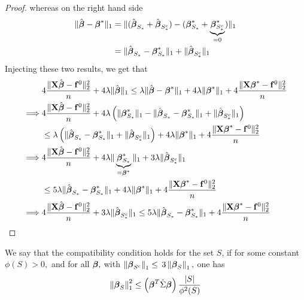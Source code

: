 \begin{proof}
    whereas on the right hand side
    \begin{align*}
        \|\hat{\boldsymbol{\beta}}-\boldsymbol{\beta}^{*} \|_{1}
         & =  \| (\hat{\boldsymbol{\beta}}_{S_{*}} + \hat{\boldsymbol{\beta}}_{S_{*}^{c}}) - (\boldsymbol{\beta}_{S_{*}}^{*} + \underbrace{\boldsymbol{\beta}_{S_{*}^{c}}^*}_{=0}) \|_{1} \\
         & =  \| \hat{\boldsymbol{\beta}}_{S_{*}}-\boldsymbol{\beta}_{S_{*}}^{*} \|_{1} + \|\hat{\boldsymbol{\beta}}_{S_{*}^{c}} \|_{1}
    \end{align*}
    Injecting these two results, we get that
    \begin{align*}
                 & 4 \frac{\| \mathbf{X} \hat {\boldsymbol{\beta}} - \mathbf{f}^0 \|_{2}^{2}}{n} + 4 \lambda\| \hat {\boldsymbol{\beta}} \|_{1} \leq \lambda \| \hat{\boldsymbol{\beta}} - \boldsymbol{\beta}^* \|_{1} + 4 \lambda \| \boldsymbol{\beta}^*\|_{1} + 4\frac{\|\mathbf{X} \boldsymbol{\beta}^* - \mathbf{f}^0\|_{2}^{2}}{n} \\
        \implies &
        4 \frac{\| \mathbf{X} \hat {\boldsymbol{\beta}} - \mathbf{f}^0 \|_{2}^{2}}{n} + 4 \lambda \left( \|\boldsymbol{\beta}_{S_{*}}^{*} \|_{1} - \|\hat{\boldsymbol{\beta}}_{S_{*}}-\boldsymbol{\beta}_{S_{*}}^{*} \|_{1}+ \|\hat{\boldsymbol{\beta}}_{S_{*}^{c}} \|_{1} \right)                             \\
                 & \leq \lambda \left( \| \hat{\boldsymbol{\beta}}_{S_{*}}-\boldsymbol{\beta}_{S_{*}}^{*} \|_{1} + \|\hat{\boldsymbol{\beta}}_{S_{*}^{c}} \|_{1} \right) + 4 \lambda \| \boldsymbol{\beta}^*\|_{1} + 4\frac{\|\mathbf{X} \boldsymbol{\beta}^* - \mathbf{f}^0\|_{2}^{2}}{n}                   \\
        \implies &
        4 \frac{\| \mathbf{X} \hat {\boldsymbol{\beta}} - \mathbf{f}^0 \|_{2}^{2}}{n} + 4 \lambda \| \underbrace{\boldsymbol{\beta}_{S_{*}}^{*}}_{= \boldsymbol{\beta}^{*}} \|_{1} + 3 \lambda\|\hat{\boldsymbol{\beta}}_{S_{*}^{c}} \|_{1}                                                      \\
                 & \leq 5 \lambda \| \hat{\boldsymbol{\beta}}_{S_{*}}-\boldsymbol{\beta}_{S_{*}}^{*} \|_{1} + 4 \lambda \| \boldsymbol{\beta}^*\|_{1} + 4\frac{\|\mathbf{X} \boldsymbol{\beta}^* - \mathbf{f}^0\|_{2}^{2}}{n}                                                                  \\
        \implies &
        4 \frac{\| \mathbf{X} \hat {\boldsymbol{\beta}} - \mathbf{f}^0 \|_{2}^{2}}{n} + 3 \lambda\|\hat{\boldsymbol{\beta}}_{S_{*}^{c}} \|_{1} \leq 5 \lambda \| \hat{\boldsymbol{\beta}}_{S_{*}}-\boldsymbol{\beta}_{S_{*}}^{*} \|_{1} + 4\frac{\|\mathbf{X} \boldsymbol{\beta}^* - \mathbf{f}^0\|_{2}^{2}}{n}        \\
    \end{align*}
\end{proof}


\begin{definition}
    We say that the compatibility condition holds for the set $S$, if for some constant $\phi(S)>0,$ and for all $\boldsymbol{\beta},$ with $\left\|\boldsymbol{\beta}_{S^{c}}\right\|_{1} \leq$ $3\left\|\boldsymbol{\beta}_{S}\right\|_{1},$ one has
    $$
        \left\|\boldsymbol{\beta}_{S}\right\|_{1}^{2} \leq\left(\boldsymbol{\beta}^{T} \hat{\Sigma} \boldsymbol{\beta}\right)\frac{|S|}{\phi^{2}(S)}
    $$
\end{definition}

